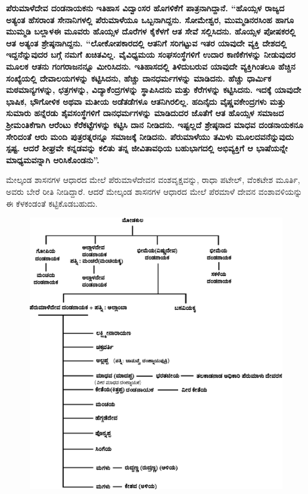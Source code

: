 \textbf{ಪೆರುಮಾಳೆದೇವ ದಂಡನಾಯಕನು ಇತಿಹಾಸ ವಿದ್ವಾಂಸರ ಹೊಗಳಿಕೆಗೆ ಪಾತ್ರನಾಗಿದ್ದಾನೆ. “ಹೊಯ್ಸಳ ರಾಜ್ಯದ ಅತ್ಯಂತ ಹೆಸರಾಂತ ಸೇನಾನಿಗಳಲ್ಲಿ ಪೆರುಮಾಳೆಯೂ ಒಬ್ಬನಾಗಿದ್ದನು. ಸೋಮೇಶ್ವರ, ಮುಮ್ಮಡಿನರಸಿಂಹ ಹಾಗೂ ಮುಮ್ಮಡಿ ಬಲ್ಲಾಳ\general{\enginline{-}}ಈ ಮೂವರು ಹೊಯ್ಸಳ ದೊರೆಗಳ ಕೈಕೆಳಗೆ ಆತ ಸೇವೆ ಸಲ್ಲಿಸಿದನು. ಹೊಯ್ಸಳ ಪೋಷಕರಲ್ಲಿ ಆತ ಅತ್ಯಂತ ಶ್ರೇಷ್ಠನಾಗಿದ್ದನು. “ಲೋಕೋಪಕಾರದಲ್ಲಿ ಆತನಿಗೆ ಸರಿಗಟ್ಟುವ ಇತರ ಯಾವುದೇ ವ್ಯಕ್ತಿ ದೇಶದಲ್ಲಿ ಇದ್ದನೆನ್ನುವುದರ ಬಗ್ಗೆ ನಮಗೆ ಖಚಿತವಿಲ್ಲ. ವೈವಿಧ್ಯಮಯ ಸಂಘಸಂಸ್ಥೆಗಳಿಗೆ ಉದಾರ ಕಾಣಿಕೆಗಳನ್ನು ನೀಡುವುದರ ಮೂಲಕ ಆತನು ಗಂಗರಾಜನನ್ನೂ ಮೀರಿಸಿದನು. ಇತಿಹಾಸದಲ್ಲಿ ತಿಳಿದುಬರುವ ಯಾವುದೇ ವ್ಯಕ್ತಿಗಿಂತಲೂ ಹೆಚ್ಚಿನ ಸಂಖ್ಯೆಯಲ್ಲಿ ದೇವಾಲಯಗಳನ್ನು ಕಟ್ಟಿಸಿದನು, ಹೆಚ್ಚು ದಾನಧರ್ಮಗಳನ್ನು ಮಾಡಿದನು. ಹೆಚ್ಚು ಧಾರ್ಮಿಕ ಮಠಮಾನ್ಯಗಳನ್ನು, ಛತ್ರಗಳನ್ನು, ವಿದ್ಯಾಕೆಂದ್ರಗಳನ್ನು ಸ್ಥಾಪಿಸಿದನು ಮತ್ತು ಕೆರೆಗಳನ್ನು ಕಟ್ಟಿಸಿದನು. ಇದಕ್ಕೆ ಯಾವುದೇ ಭಾಷಿಕ, ಭೌಗೋಳಿಕ ಅಥವಾ ಮತೀಯ ಅಡೆತಡೆಗಳೂ ಆತನಿಗಿರಲಿಲ್ಲ. ಹದಿನೈದು ವೈಷ್ಣವಕೇಂದ್ರಗಳು ಮತ್ತು ಸುಮಾರು ಹನ್ನೆರಡು ಶೈವಸಂಸ್ಥೆಗಳಿಗೆ ದಾನಧರ್ಮಗಳನ್ನು ಮಾಡಿದುದರ ಜೊತೆಗೆ ಆತ ಹೊಯ್ಸಳ ಸಮಾಜದ ಶ‍್ರೀಮಂತಿಕೆಗಾಗಿ ಆರೆಂಟು ಕೆರೆಕಟ್ಟೆಗಳನ್ನು ಕಟ್ಟಿಸಿ ದಾನ ನೀಡಿದನು. ಇಷ್ಟಲ್ಲದೆ ಶ್ರೇಷ್ಠನಾದ ಮಾಧವ ದಂಡನಾಯಕನೂ ಸೇರಿದಂತೆ ಆರು ಮಂದಿ ಪುತ್ರರತ್ನರನ್ನೂ ಸಮಾಜಕ್ಕೆ ನೀಡಿದನು. ಪೆರುಮಾಳೆಯು ತಮಿಳು ಮೂಲದವನೆನ್ನುವುದು ಸ್ಪಷ್ಟ. ಆದರೆ ಶೀಘ್ರವೇ ಕನ್ನಡವನ್ನು ಕಲಿತು ತನ್ನ ಜೀವಿತಾವಧಿಯ ಬಹುಭಾಗದಲ್ಲಿ ಅಭಿವ್ಯಕ್ತಿಗೆ ಆ ಭಾಷೆಯನ್ನೇ ಮಾಧ್ಯಮವನ್ನಾಗಿ ಆರಿಸಿಕೊಂಡನು”.}

\newpage

ಮೇಲ್ಕಂಡ ಶಾಸನಗಳ ಆಧಾರದ ಮೇಲೆ ಪೆರುಮಾಳೆದೇವನ ವಂಶವೃಕ್ಷವನ್ನು, ರಾಧಾ ಪಟೇಲ್​, ವೆಂಕಟೇಶ ಮೂರ್ತಿ, ಅವರು ಬೇರೆ ರೀತಿ ನೀಡಿದ್ದಾರೆ. ಆದರೆ ಮೇಲ್ಕಂಡ ಶಾಸನಗಳ ಆಧಾರದ ಮೇಲೆ ಪೆರಮಾಳೆ ದೇವನ ವಂಶಾವಳಿಯನ್ನು ಈ ಕೆಳಕಂಡಂತೆ ಕಟ್ಟಿಕೊಡಬಹುದು.

\begin{figure}[H]
\includegraphics[scale=.28]{images/chap3/chap3fig24.jpeg}
\end{figure}

